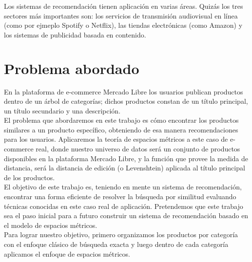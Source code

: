 
Los sistemas de recomendaci\'on tienen aplicaci\'on en varias \'areas. Quiz\'as los tres sectores m\'as importantes son: los servicios de transmisi\'on audiovisual en l\'inea (como por ejmeplo Spotify o Netflix), las tiendas electr\'onicas (como Amazon) y los sistemas de publicidad basada en contenido.\\

\section{Problema abordado}

En la plataforma de e-commerce Mercado Libre los usuarios publican productos dentro de un \'arbol de categor\'ias; dichos productos constan de un t\'itulo principal, un t\'itulo secundario y una descripci\'on.\\

El problema que abordaremos en este trabajo es c\'omo encontrar los productos similares a un producto espec\'ifico, obteniendo de esa manera recomendaciones para los usuarios. Aplicaremos la teor\'ia de espacios m\'etricos a este caso de e-commerce real, donde nuestro universo de datos ser\'a un conjunto de productos disponibles en la plataforma Mercado Libre, y la funci\'on que provee la medida de distancia, ser\'a la distancia de edici\'on (o Levenshtein) aplicada al t\'itulo principal de los productos.\\

El objetivo de este trabajo es, teniendo en mente un sistema de recomendaci\'on, encontrar una forma eficiente de resolver la b\'usqueda por similitud  evaluando t\'ecnicas conocidas en este caso real de aplicaci\'on. Pretendemos que este trabajo sea el paso inicial para a futuro construir un sistema de recomendaci\'on basado en el modelo de espacios m\'etricos.\\

Para lograr nuestro objetivo, primero organizamos los productos por categor\'ia con el enfoque cl\'asico de b\'usqueda exacta y luego dentro de cada categor\'ia aplicamos el enfoque de espacios m\'etricos. \\

